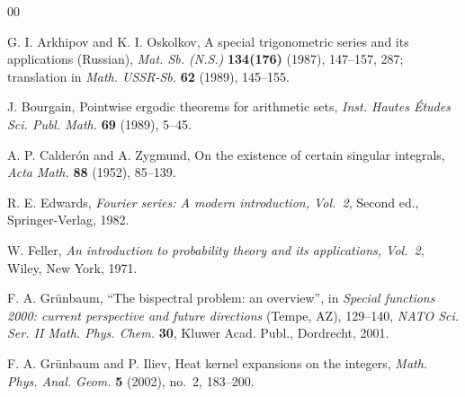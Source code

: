 \documentclass[11pt]{amsart}
\numberwithin{equation}{section}
\theoremstyle{plain}
\theoremstyle{remark}
\begin{document}
\begin{thebibliography}{00}

G. I. Arkhipov and K. I. Oskolkov,
A special trigonometric series and its applications (Russian),
\textit{Mat. Sb. (N.S.)} \textbf{134(176)} (1987), 147--157, 287;
translation in
\textit{Math. USSR-Sb.} \textbf{62} (1989), 145--155.






J. Bourgain,
Pointwise ergodic theorems for arithmetic sets,
\textit{Inst. Hautes \'Etudes Sci. Publ. Math.} \textbf{69} (1989), 5--45.

A. P. Calder\'on and A. Zygmund,
On the existence of certain singular integrals,
\textit{Acta Math.} \textbf{88} (1952), 85--139.

R. E. Edwards,
\textit{Fourier series: A modern introduction, Vol.~2}, Second ed.,
Springer-Verlag, 1982.

W. Feller,
\textit{An introduction to probability theory and its applications, Vol.~2},
Wiley, New York, 1971.

F. A. Gr\"unbaum,
``The bispectral problem: an overview'', in
\textit{Special functions 2000: current perspective and future directions} (Tempe, AZ), 129--140,
\textit{NATO Sci. Ser. II Math. Phys. Chem.} \textbf{30},
Kluwer Acad. Publ., Dordrecht, 2001.

F. A. Gr\"unbaum and P. Iliev,
Heat kernel expansions on the integers,
\textit{Math. Phys. Anal. Geom.} \textbf{5} (2002), no.~2, 183--200.


\end{thebibliography}
\end{document}
